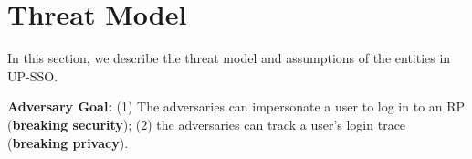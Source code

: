 \section{Threat Model}
\label{sec:threatmodel}
In this section, we describe the threat model and assumptions of the entities in UP-SSO.

\vspace{1mm}\noindent\textbf{Adversary Goal: }(1) The adversaries can impersonate a user to log in to an RP (\textbf{breaking security}); (2) the adversaries can track a user's login trace (\textbf{breaking privacy}).
\begin{comment}
\item \noindent\textbf{Breaking the security. }The adversaries can impersonate an honest user to log in to the honest RP.
\item \noindent\textbf{Breaking the privacy. }The adversaries can track a user's login trace on each RP.
\end{comment}

